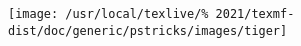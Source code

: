 \documentclass{article}
\begin{document}
	\texttt{[image: /usr/local/texlive/\%
		2021/texmf-dist/doc/generic/pstricks/images/tiger]}
\end{document}
